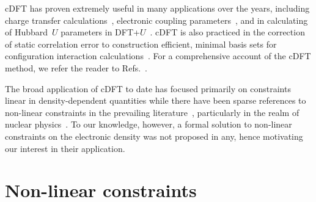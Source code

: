 {
cDFT has  proven extremely useful in many applications 
over the years}, including 
charge transfer calculations~\cite{PhysRevB.88.165112,
PhysRevB.93.165102,
doi:10.1021/ct0503163,
doi:10.1021/jp061848y,
doi:10.1021/jp204962k,
doi:10.1021/jp103153a,
:/content/aip/journal/jcp/125/16/10.1063/1.2360263,
doi:10.1021/jp912049p,
doi:10.1021/jp106989t,
doi:10.1063/1.3190169,
PhysRevB.77.115421,
Kubas14jcp,
Kubas15pccp,
doi:10.1021/acs.chemrev.7b00086}, 
electronic coupling parameters~\cite{doi:10.1063/1.3507878,Kubas14jcp,Kubas15pccp}, 
and in calculating of Hubbard~$U$ 
parameters in DFT+$U$~\cite{PhysRevB.44.943,PhysRevB.74.235113,PhysRevB.67.153106,PhysRevB.39.9028}.
%
cDFT is also practiced in the correction of static correlation error 
to construction efficient, minimal basis sets for configuration interaction 
calculations~\cite{:/content/aip/journal/jcp/127/16/10.1063/1.2800022,
:/content/aip/journal/jcp/140/18/10.1063/1.4862497,
:/content/aip/journal/jcp/130/3/10.1063/1.3059784,
:/content/aip/journal/jcp/133/6/10.1063/1.3470106}.
% 
For a comprehensive account of the cDFT method, 
we refer the reader to 
Refs.~\cite{PhysRevLett.53.2512,
PhysRevA.72.024502,
PhysRevB.94.035159,
doi10.1021/cr200148b,
doi:10.1021/acs.chemrev.7b00086}.

The broad application of cDFT to date 
has focused primarily on constraints 
linear in density-dependent quantities 
while there have been sparse references
to non-linear constraints in the prevailing
literature~\cite{PhysRevLett.79.1337,PhysRevB.59.12173,GIRAUD197023}, 
particularly in the realm of nuclear physics~\cite{FLOCARD1973433,Staszczak2010,PhysRevC.78.024313}.
%
To our knowledge, however, 
a formal solution to non-linear constraints 
on the electronic density was not proposed in any,  
hence motivating our interest in their application.

\section{Non-linear constraints}
\label{sec:non_linear_constraints}


